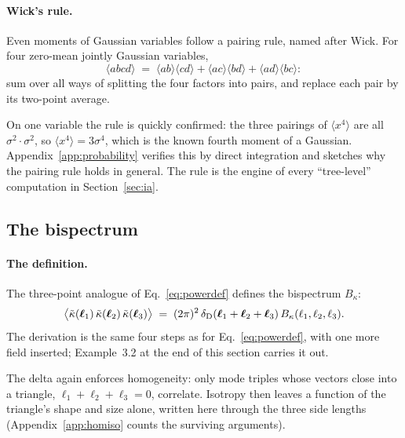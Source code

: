 \documentclass[11pt]{article}
\newcommand{\bell}{\boldsymbol{\ell}}
\numberwithin{equation}{section}
\begin{document}
\paragraph{Wick's rule.}
Even moments of Gaussian variables follow a pairing rule, named after
Wick.  For four zero-mean jointly Gaussian variables,
\begin{equation}
  \langle abcd \rangle \;=\;
  \langle ab\rangle\langle cd\rangle
  + \langle ac\rangle\langle bd\rangle
  + \langle ad\rangle\langle bc\rangle :
  \label{eq:pairrule}
\end{equation}
sum over all ways of splitting the four factors into pairs, and
replace each pair by its two-point average.

On one variable the rule is quickly confirmed: the three pairings of
$\langle x^4\rangle$ are all $\sigma^2 \cdot \sigma^2$, so
$\langle x^4\rangle = 3\sigma^4$, which is the known fourth moment of
a Gaussian.  Appendix~\ref{app:probability} verifies this by direct
integration and sketches why the pairing rule holds in general.  The
rule is the engine of every ``tree-level'' computation in
Section~\ref{sec:ia}.

\subsection{The bispectrum}
\label{sec:bispec}

\paragraph{The definition.}
The three-point analogue of Eq.~\eqref{eq:powerdef} defines the
bispectrum $B_\kappa$:
\begin{equation}
  \bigl\langle \tilde\kappa(\bell_1)\,\tilde\kappa(\bell_2)\,
  \tilde\kappa(\bell_3) \bigr\rangle
  \;=\; (2\pi)^2\, \delta_{\rm D}(\bell_1 + \bell_2 + \bell_3)\,
  B_\kappa(\ell_1, \ell_2, \ell_3).
  \label{eq:bispecdef}
\end{equation}
The derivation is the same four steps as for
Eq.~\eqref{eq:powerdef}, with one more field inserted;
Example~3.2 at the end of this section carries it out.

The delta again enforces homogeneity: only mode triples whose vectors
close into a triangle, $\bell_1 + \bell_2 + \bell_3 = 0$, correlate.
Isotropy then leaves a function of the triangle's shape and size
alone, written here through the three side lengths
(Appendix~\ref{app:homiso} counts the surviving arguments).
\end{document}
